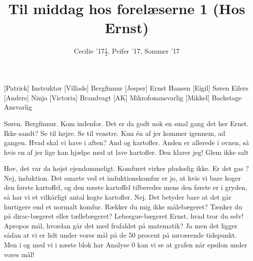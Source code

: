\documentclass[a4paper,11pt]{article}
\title{Til middag hos forelæserne 1 (Hos Ernst)}
\author{Cecilie '17$\frac{1}{2}$, Peifer '17, Sommer '17}
\begin{document}
\maketitle

\begin{roles}
[Patrick] Instruktør
[Villads] Bergfinnur
[Jesper] Ernst Hansen
[Eigil] Søren Eilers
[Anders] Ninja
[Victoria] Brandvagt
[AK] Mikrofonansvarlig
[Mikkel] Backstage Ansvarlig
\end{roles}

\begin{sketch}


 Søren. Bergfinnur. Kom indenfor.
 Det er da godt nok en smal gang det her Ernst. Ikke sandt?
 Se til højre. Se til venstre. Kun én af jer kommer igennem, ad gangen.
 Hvad skal vi have i aften?
 And og kartofler. Anden er allerede i ovnen, så hvis en af jer lige kan hjælpe med at lave kartofler.
 Den klarer jeg!
 Glem ikke salt

 Hov, det var da højst ejendommeligt. Komfuret virker pludselig ikke.
 Er det gas ?
 Nej, induktion.
 Det smarte ved et induktionskomfur er jo, at hvis vi bare koger den første kartoffel, og den næste kartoffel tilberedes mens den første er i gryden, så har vi et vilkårligt antal kogte kartofler.
 Nej. Det betyder bare at det går hurtigere end et normalt komfur.
 Rækker du mig ikke målebægeret?
 Tænker du på dirac-bægeret eller tællebægeret?
 Lebesgue-bægeret Ernst, hvad tror du selv!
 Apropos mål, hvordan går det med frafaldet på matematik?
 Ja men det ligger sådan at vi er lidt under vores mål på de 50 procent på nuværende tidspunkt. Men i og med vi i næste blok har Analyse 0 kan vi se at grafen når epsilon under vores mål!



\end{sketch}
\end{document}
